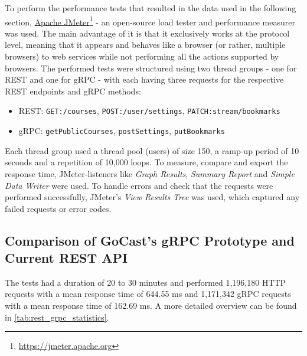 To perform the performance tests that resulted in the data used in the following section, \href{https://jmeter.apache.org}{Apache JMeter}\footnote{\url{https://jmeter.apache.org}} - an open-source load tester and performance measurer was used. The main advantage of it is that it exclusively works at the protocol level, meaning that it appears and behaves like a browser (or rather, multiple browsers) to web services while not performing all the actions supported by browsers. The performed tests were structured using two thread groups - one for \ac{REST} and one for \ac{gRPC} - with each having three requests for the respective \ac{REST} endpoints and \ac{gRPC} methods:
\begin{itemize}
    \item \ac{REST}: \texttt{GET:/courses}, \texttt{POST:/user/settings}, \texttt{PATCH:stream/bookmarks}
    \item \ac{gRPC}: \texttt{getPublicCourses}, \texttt{postSettings}, \texttt{putBookmarks}
\end{itemize}
\break
Each thread group used a thread pool (users) of size 150, a ramp-up period of 10 seconds and a repetition of 10,000 loops.
To measure, compare and export the response time, JMeter-listeners like \textit{Graph Results}, \textit{Summary Report} and \textit{Simple Data Writer} were used. To handle errors and check that the requests were performed successfully, JMeter’s \textit{View Results Tree} was used, which captured any failed requests or error codes.

\subsection{Comparison of GoCast's gRPC Prototype and Current REST API}
The tests had a duration of 20 to 30 minutes and performed 1,196,180 HTTP requests with a mean response time of 644.55 ms and 1,171,342 \ac{gRPC} requests with a mean response time of 162.69 ms. A more detailed overview can be found in \autoref{tab:rest_grpc_statistics}.

